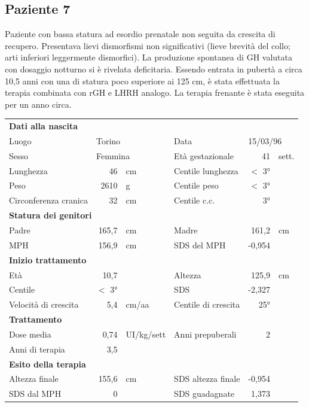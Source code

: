 \subsection*{Paziente 7}%

Paziente con bassa statura ad esordio prenatale non seguita da crescita di recupero. Presentava lievi dismorfismi non significativi (lieve brevità del collo; arti inferiori leggermente dismorfici). La produzione spontanea di GH valutata con dosaggio notturno si è rivelata deficitaria. Essendo entrata in pubertà a circa 10,5 anni con una di statura poco superiore ai 125 cm, è stata effettuata la terapia combinata con rGH e LHRH analogo. La terapia frenante è stata eseguita per un anno circa. 

\begin{table}[!h]
\begin{tabular}{lrllrl}
\toprule
\multicolumn{6}{l}{\textbf{Dati alla nascita}}\\
Luogo 		& \multicolumn{2}{l}{Torino} 	& Data 					& \multicolumn{2}{l}{15/03/96} 	\\
Sesso 		& \multicolumn{2}{l}{Femmina} 	& Età gestazionale 		& 41 		& sett.\\
Lunghezza 	& 46 		& cm 				& Centile lunghezza		& $<$ 3° 		\\
Peso 		& 2610 		& g					& Centile peso			& $<$ 3° 		\\
Circonferenza cranica	& 32 		& cm 	& Centile c.c.			& 3° \\
\midrule
\multicolumn{6}{l}{\textbf{Statura dei genitori}}\\
Padre 		& 165,7 & cm 	& Madre 				& 161,2 & cm \\
MPH 		& 156,9 & cm 	& SDS del MPH 			& -0,954\\
\midrule
\multicolumn{6}{l}{\textbf{Inizio trattamento}} \\
Età	& 10,7 & 		& Altezza 				& 125,9 & cm  \\
Centile & $<$ 3° 	 &		& SDS		& -2,327 \\
Velocità di crescita & 5,4 & cm/aa	& Centile di crescita & 25°\\
\midrule
\multicolumn{6}{l}{\textbf{Trattamento}} \\
Dose media		& 0,74 & UI/kg/sett & Anni prepuberali & 2\\
Anni di terapia & 3,5\\
\midrule
\multicolumn{6}{l}{\textbf{Esito della terapia}} \\
Altezza finale			& 155,6 & cm 	& SDS altezza finale		& -0,954\\
SDS dal MPH				& 0 &		& SDS guadagnate 			& 1,373\\
\bottomrule
\end{tabular}
\end{table}
\clearpage

